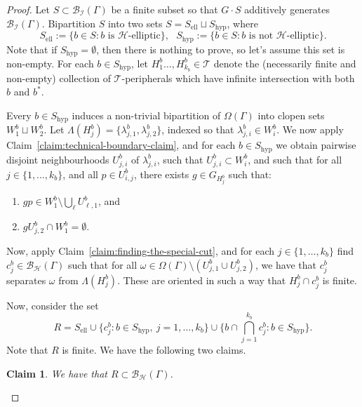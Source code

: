 \documentclass[10pt,a4paper]{amsart}
\newtheorem{claim}{Claim}
\newcommand{\br}{{\mathscr{B}}}
\newcommand{\per}{\mathcal{H}}
\begin{document}
    \begin{proof}
        Let $S \subset \br_{\mathcal I}(\Gamma)$ be a finite subset so that $G \cdot S$ additively generates $\br_{\mathcal I}(\Gamma)$.  Bipartition $S$ into two sets $S = S_{\mathrm{ell}} \sqcup S _{\mathrm{hyp}}$, where
        $$
        S_{\mathrm{ell}} := \{b \in S : \text{$b$ is $\per$-elliptic}\}, \ \ \ S_{\mathrm{hyp}} := \{b \in S : \text{$b$ is not $\per$-elliptic}\}.
        $$
        Note that if $S_{\mathrm{hyp}} = \emptyset$, then there is nothing to prove, so let's assume this set is non-empty. For each $b \in S_{\mathrm{hyp}}$, let $H_1^{b} \ldots, H_{k_b}^b \in \mathcal T$ denote the (necessarily finite and non-empty) collection of $\mathcal T$-peripherals which have infinite intersection with both $b$ and $b^\ast$. 

        Every $b \in S_{\mathrm{hyp}}$ induces a non-trivial bipartition of $\Omega(\Gamma)$ into clopen sets $W_1^b \sqcup W_2^b$. Let $\Lambda(H_j^b) = \{\lambda_{j,1}^b, \lambda_{j,2}^b\}$, indexed so that $\lambda^b_{j,i} \in W_i^b$. 
        We now apply Claim~\ref{claim:technical-boundary-claim}, and for each $b \in S_{\mathrm{hyp}}$ we obtain pairwise disjoint neighbourhoods $U_{j,i}^b$ of $\lambda_{j,i}^b$, such that $U_{j,i}^b \subset W_i^b$, and such that for all $j \in \{1,\ldots, k_b\}$, and all $p \in U_{i,j}^b$, there exists $g \in G_{H_j^b}$ such that:
            \begin{enumerate}
                \item $gp \in W_1^b \setminus \bigcup _\ell U_{\ell,1}^b$, and

                \item $gU_{j,2}^b \cap W_1^b = \emptyset$.
            \end{enumerate}
        Now, apply Claim~\ref{claim:finding-the-special-cut}, and for each $j \in \{1, \ldots, k_b\}$ find $c^b_j \in \br_\per(\Gamma)$ such that for all $\omega \in \Omega(\Gamma) \setminus (U_{j,1}^b \cup U_{j,2}^b)$, we have that $c_j^b$ separates $\omega$ from $\Lambda(H_j^b)$. These are oriented in such a way that $H_j^b \cap c_j^b$ is finite. 

        Now, consider the set 
        $$
        R = S_{\mathrm{ell}} \cup \Big\{c_j^b : b \in S_{\mathrm{hyp}}, \ j = 1, \ldots, k_b  \Big\} \cup \Bigg\{ b \cap \bigcap_{j=1}^{k_b} c_j^b : b \in S_{\mathrm{hyp}}  \Bigg\}. 
        $$
        Note that $R$ is finite. We have the following two claims.

        \begin{claim}
            We have that $R \subset \br_\per(\Gamma)$.
        \end{claim}


\end{proof}
\end{document}
